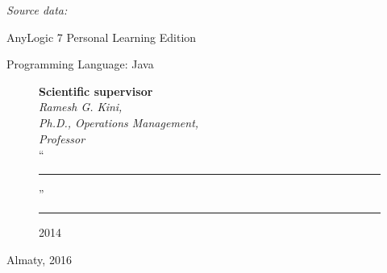 \begin{titlepage}
    \emph{Source data:}

    \begin{compactitem}
    \item AnyLogic 7 Personal Learning Edition
    \item Programming Language: Java
    \end{compactitem}


    \begin{figure}[ht]
            \begin{minipage}[t]{0.6\linewidth}
                {\bf Scientific supervisor}\\

                {\em Ramesh G. Kini,\\
                Ph.D., Operations Management, \\
                Professor}\\

                ``\rule{2em}{0.4pt}'' \rule{8em}{0.4pt} 2014\\
         \end{minipage}
    \end{figure}

    \begin{center}
        \vfill
        Almaty, 2016
    \end{center}

    \end{titlepage}